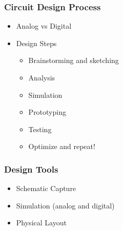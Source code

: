 \documentclass[12pt]{beamer}
\begin{document}
\begin{frame}
\frametitle{Circuit Design Process}

  \begin{itemize}
  \item Analog vs Digital
  \item Design Steps
    \begin{itemize}
    \item Brainstorming and sketching
    \item Analysis
    \item Simulation
    \item Prototyping
    \item Testing
    \item Optimize and repeat!
    \end{itemize}
  \end{itemize}
  
\end{frame}

\begin{frame}
\frametitle{Design Tools}

  \begin{itemize}
  \item Schematic Capture
  \item Simulation (analog and digital)
  \item Physical Layout


  \end{itemize}
  

\end{frame}
\end{document}
